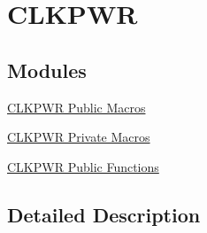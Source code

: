 \hypertarget{group___c_l_k_p_w_r}{}\section{C\+L\+K\+P\+WR}
\label{group___c_l_k_p_w_r}
\subsection*{Modules}
\begin{DoxyCompactItemize}
\item 
\hyperlink{group___c_l_k_p_w_r___public___macros}{C\+L\+K\+P\+W\+R Public Macros}
\item 
\hyperlink{group___c_l_k_p_w_r___private___macros}{C\+L\+K\+P\+W\+R Private Macros}
\item 
\hyperlink{group___c_l_k_p_w_r___public___functions}{C\+L\+K\+P\+W\+R Public Functions}
\end{DoxyCompactItemize}


\subsection{Detailed Description}
